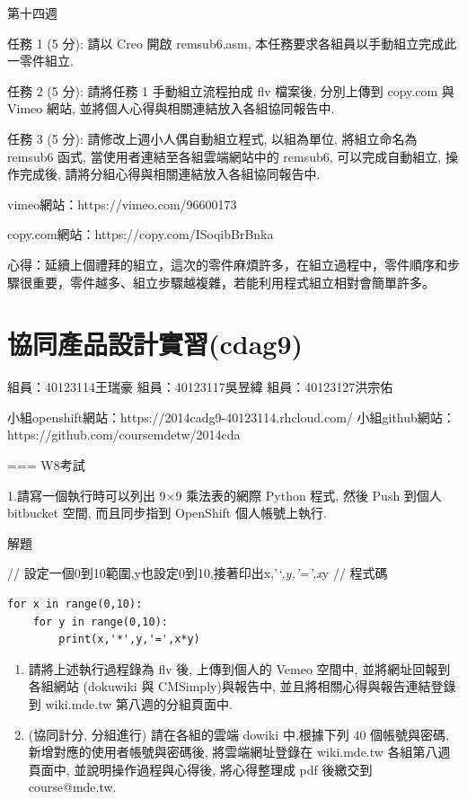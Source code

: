 \documentclass[]{article}
\begin{document}
第十四週

任務 1 (5 分): 請以 Creo 開啟 remsub6.asm,
本任務要求各組員以手動組立完成此一零件組立.

任務 2 (5 分): 請將任務 1 手動組立流程拍成 flv 檔案後, 分別上傳到
copy.com 與 Vimeo 網站, 並將個人心得與相關連結放入各組協同報告中.

任務 3 (5 分): 請修改上週小人偶自動組立程式, 以組為單位, 將組立命名為
remsub6 函式, 當使用者連結至各組雲端網站中的 remsub6, 可以完成自動組立,
操作完成後, 請將分組心得與相關連結放入各組協同報告中.

vimeo網站：https://vimeo.com/96600173

copy.com網站：https://copy.com/ISoqibBrBnka

心得：延續上個禮拜的組立，這次的零件麻煩許多，在組立過程中，零件順序和步驟很重要，零件越多、組立步驟越複雜，若能利用程式組立相對會簡單許多。

\section{協同產品設計實習(cdag9)}\label{ux5354ux540cux7522ux54c1ux8a2dux8a08ux5be6ux7fd2cdag9}

組員：40123114王瑞豪 組員：40123117吳昱緯 組員：40123127洪宗佑

小組openshift網站：https://2014cadg9-40123114.rhcloud.com/
小組github網站：https://github.com/coursemdetw/2014cda

=== W8考試

1.請寫一個執行時可以列出 9×9 乘法表的網際 Python 程式, 然後 Push 到個人
bitbucket 空間, 而且同步指到 OpenShift 個人帳號上執行.

解題

// 設定一個0到10範圍,y也設定0到10,接著印出x,'\emph{`,y,'=',x}y // 程式碼

\begin{verbatim}
for x in range(0,10):
    for y in range(0,10):
        print(x,'*',y,'=',x*y)
\end{verbatim}

\begin{enumerate}
\def\labelenumi{\arabic{enumi}.}
\setcounter{enumi}{1}
\item
  請將上述執行過程錄為 flv 後, 上傳到個人的 Vemeo 空間中,
  並將網址回報到各組網站 (dokuwiki 與 CMSimply)與報告中,
  並且將相關心得與報告連結登錄到 wiki.mde.tw 第八週的分組頁面中.
\item
  (協同計分, 分組進行) 請在各組的雲端 dowiki 中,根據下列 40
  個帳號與密碼, 新增對應的使用者帳號與密碼後, 將雲端網址登錄在
  wiki.mde.tw 各組第八週頁面中, 並說明操作過程與心得後, 將心得整理成 pdf
  後繳交到 course@mde.tw.
\end{enumerate}
\end{document}
